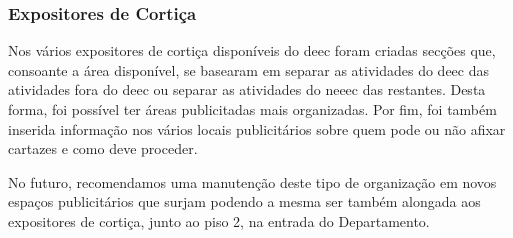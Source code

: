 
\subsubsection{Expositores de Cortiça}

Nos vários expositores de cortiça disponíveis do \acrshort{deec} foram criadas secções que, consoante a área disponível, se basearam em separar as atividades do \acrshort{deec} das atividades fora do \acrshort{deec} ou separar as atividades do \acrshort{neeec} das restantes. Desta forma, foi possível ter áreas publicitadas mais organizadas. Por fim, foi também inserida informação nos vários locais publicitários sobre quem pode ou não afixar cartazes e como deve proceder.

No futuro, recomendamos uma manutenção deste tipo de organização em novos espaços publicitários que surjam podendo a mesma ser também alongada aos expositores de cortiça, junto ao piso 2, na entrada do Departamento.